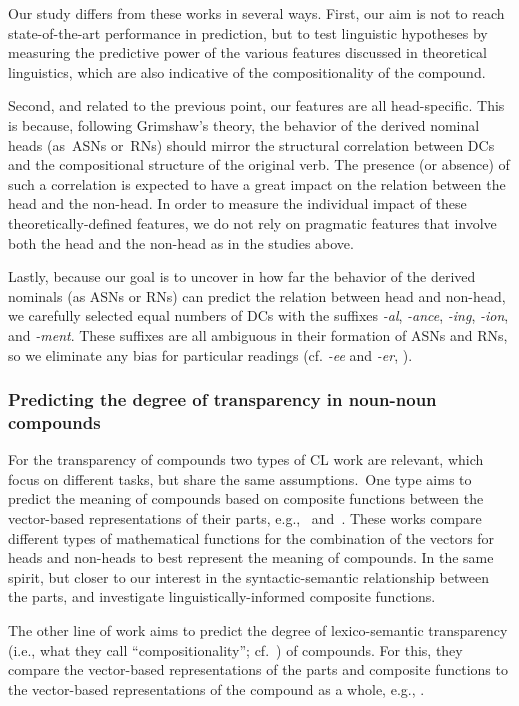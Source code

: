 \documentclass[output=paper]{langsci/langscibook}
\begin{document}
Our study differs from these works in several ways. First, our aim is not to reach state-of-the-art performance in prediction, but to  {test linguistic hypotheses by} measuring the predictive power of the various features discussed in theoretical linguistics, which are also indicative of the  {compositionality} of the compound. 

Second, and related to the previous point, our features are all head-specific. This is because,  following Grimshaw's theory, the behavior of the derived nominal heads (as~ASNs or~RNs) should mirror the structural correlation between DCs and the compositional structure of the original verb. The presence (or absence) of such a correlation is expected to have a great impact on the relation between the head and the non-head. In order to measure the individual impact of these theoretically-defined features, we do not rely on pragmatic features  {that involve both the head and the non-head} as in the studies above.
 

Lastly, because our goal is to uncover in how far the behavior of the derived nominals (as ASNs or RNs) can  predict the relation between head and non-head, we carefully selected  {equal numbers} of DCs with the suffixes \textit{-al}, \textit{-ance},  \textit{-ing},  \textit{-ion}, and  \textit{-ment}. These suffixes are all ambiguous in their formation of ASNs and RNs, so we eliminate any bias for particular readings (cf. \textit{-ee} and \textit{-er}, ).

\subsubsection{Predicting  {the degree of transparency in noun-noun} compounds}\label{sec:NLP:lit:compositional}
For the transparency of  compounds two types of CL work are relevant,  {which} focus on different tasks, but share the same assumptions.\ One type  aims to predict the meaning of compounds based on composite functions between the vector-based representations of their parts, e.g.,~\cite{OSeaghdha:2008} and~\cite{Mitchell:2010}.
These works  compare different types of mathematical functions for the combination of the vectors for heads and non-heads to best represent the  meaning of compounds.  {In the same spirit, but closer to our interest in the syn\-tac\-tic-semantic relationship between the parts, \cite{marelli:baroni:15} and \cite{baroni:zamparelli:10} investigate linguistically-informed composite functions.}

The other line of work aims to predict the degree of  {lexico-semantic transparency}  {(i.e., what they call ``compositionality''; cf.~)} of compounds. For this, they compare the vector-based representations of the parts and composite functions  {to} the vector-based representations of the compound as a whole, e.g., \cite{SchulteImWaldeEtAl:16,Reddy:2011}. 
\end{document}

